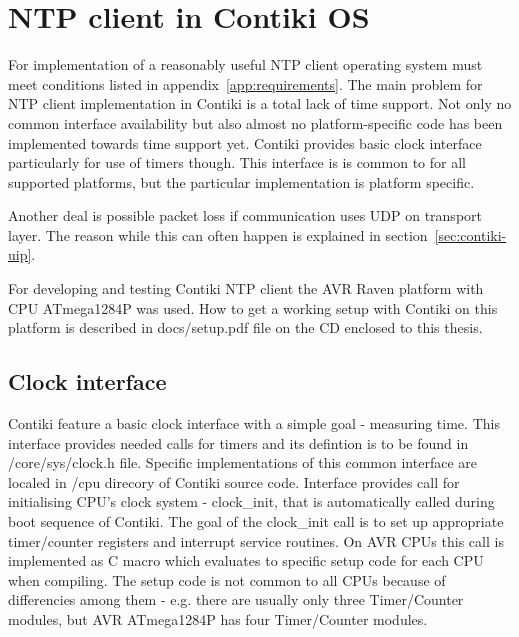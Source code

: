 
\chapter{NTP client in Contiki OS}

For implementation of a reasonably useful NTP client
operating system must meet conditions listed in appendix~\ref{app:requirements}.
The main problem for NTP client implementation in Contiki is a total
lack of time support.
Not only no common interface availability but also
almost no platform-specific code has been implemented towards time support yet.
Contiki provides basic clock interface particularly for use of timers though.
This interface is is common to for all supported platforms, but the particular implementation
is platform specific.

Another deal is possible packet loss if communication uses UDP on transport layer.
The reason while this can often happen is explained in section~\ref{sec:contiki-uip}.

For developing and testing Contiki NTP client the AVR Raven platform with CPU ATmega1284P was used.
How to get a working setup with Contiki on this platform is described in
docs/setup.pdf file on the CD enclosed to this thesis.

\section{Clock interface}
Contiki feature a basic clock interface with a simple goal - measuring time.
This interface provides needed calls for timers and its defintion is to be found in /core/sys/clock.h file.
Specific implementations of this common interface are localed in /cpu direcory of Contiki source code.
Interface provides call for initialising CPU's clock system - clock\_init, that is automatically called during
boot sequence of Contiki.
The goal of the clock\_init call is to set up
appropriate timer/counter registers and interrupt service routines.
On AVR CPUs this call is implemented as C macro which evaluates to specific setup code for each CPU
when compiling.
The setup code is not common to all CPUs because of differencies among them - e.g. there are usually
only three Timer/Counter modules, but AVR ATmega1284P has four Timer/Counter modules.

